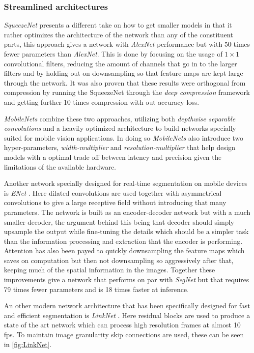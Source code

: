 \documentclass{kththesis}
\newcommand{\bibentry}[1]{\parencite{#1}}
\begin{document}
\subsubsection{Streamlined architectures}
\emph{SqueezeNet} \bibentry{iandola2016squeezenet} presents a different take on
how to get smaller models in that it rather optimizes the architecture of the
network than any of the constituent parts, this approach gives a network with
\emph{AlexNet} performance but with 50 times fewer parameters than 
\emph{AlexNet}. This is done by focusing on the usage of \(1 \times 1\)
convolutional filters, reducing the amount of channels that go in to the larger
filters and by holding out on downsampling so that feature maps are kept large
through the network. It was also proven that these results were orthogonal from
compression by running the SqueezeNet through the \emph{deep compression}
framework \bibentry{han2015deep} and getting further 10 times compression with
out accuracy loss. 

\emph{MobileNets} \bibentry{howard2017mobilenets} combine these two approaches,
utilizing both \emph{depthwise separable convolutions} and a heavily optimized
architecture to build networks specially suited for mobile vision applications.
In doing so \emph{MobileNets} also introduce two hyper-parameters,
\emph{width-multiplier} and \emph{resolution-multiplier} that help design models
with a optimal trade off between latency and precision given the limitations of
the available hardware. 

Another network specially designed for real-time segmentation on mobile devices
is \emph{ENet} \bibentry{paszke2016enet}. Here dilated convolutions are used
together with asymmetrical convolutions to give a large receptive field without
introducing that many parameters. The network is built as an encoder-decoder
network but with a much smaller decoder, the argument behind this being that
decoder should simply upsample the output while fine-tuning the details which
should be a simpler task than the information processing and extraction that the
encoder is performing. Attention has also been payed to quickly downsampling the
feature maps which saves on computation but then not downsampling so
aggressively after that, keeping much of the spatial information in the images.
Together these improvements give a network that performs on par with
\emph{SegNet} but that requires 79 times fewer parameters and is 18 times faster
at inference. 

An other modern network architecture that has been specifically designed for fast and
efficient segmentation is \textit{LinkNet}
\parencite{chaurasia2017linknet}. Here residual blocks \parencite{residual} are used to produce a
state of the art network which can process high resolution frames at almost 10
fps. To maintain image granularity skip connections are used, these can be seen
in \cref{fig:LinkNet}.
\end{document}
